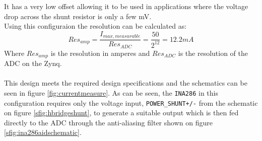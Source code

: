 It has a very low offset allowing it to be used in applications where the voltage drop across the shunt resistor is only a few mV.
\\
Using this configuraion the resolution can be calculated as:
\begin{equation}
	Res_{amp} = \frac{I_{max,measurable}}{Res_{ADC}} = \frac{50}{2^{12}}  = 12.2 mA
\end{equation}
Where $Res_{amp}$ is the resolution in amperes and $Res_{ADC}$ is the resolution of the ADC on the Zynq.
\\~\\
This design meets the required design specifications and the schematics can be seen in figure \ref{fig:currentmeasure}.
As can be seen, the \texttt{INA286} in this configuration requires only the voltage input, \texttt{POWER\_SHUNT+/-} from the schematic on figure \ref{sfig:hbridgeshunt}, to generate a suitable output which is then fed directly to the ADC through the anti-aliasing filter shown on figure \ref{sfig:ina286aidschematic}.

